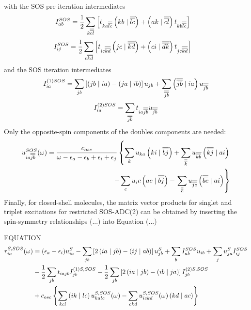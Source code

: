 \noindent with the SOS pre-iteration intermediates 
\begin{equation}
\begin{split}
I_{ab}^{SOS} &= \frac{1}{2} \sum_{k\overline{\overline{cl}}} \left[ t_{ka\overline{\overline{lc}}} \left( kb \mid \overline{\overline{lc}} \right) + \left( ak \mid \overline{\overline{cl}} \right) t_{kb\overline{\overline{lc}}} \right]
\end{split}
\end{equation}
\begin{equation}
\begin{split}
I_{ij}^{SOS} &= \frac{1}{2} \sum_{c\overline{\overline{kd}}} \left[ t_{ic\overline{\overline{kd}}} \left( jc \mid \overline{\overline{kd}} \right) + \left( ci \mid \overline{\overline{dk}} \right) t_{jc\overline{\overline{kd}}} \right]  
\end{split}
\end{equation}
\noindent and the SOS iteration intermediates
\begin{equation}
I_{ia}^{(1)SOS} = \sum_{jb} \left[ \left( jb \mid ia \right) - \left( ja \mid ib \right) \right] u_{jb} + \sum_{\overline{\overline{jb}}} \left( \overline{\overline{jb}} \mid ia \right) u_{\overline{\overline{jb}}}
\end{equation}
\begin{equation}
I_{ia}^{(2)SOS} = \sum_{\overline{\overline{jb}}} t_{ia\overline{\overline{jb}}} u_{\overline{\overline{jb}}}
\end{equation}
\noindent Only the opposite-spin components of the doubles components are needed:
\begin{equation}
\begin{split}
u_{ia\overline{\overline{jb}}}^{SOS}(\omega) = \frac{c_{osc}}{\omega - \epsilon_a - \epsilon_b + \epsilon_i + \epsilon_j} \left\lbrace \sum_k u_{ka} \left( ki \mid \overline{\overline{bj}} \right) + \sum_{\overline{\overline{k}}} u_{\overline{\overline{kb}}} \left( \overline{\overline{kj}} \mid ai \right) \right. \\ - \sum_c u_ic \left( ac \mid \overline{\overline{bj}} \right) - \left. \sum_{\overline{\overline{c}}} u_{\overline{\overline{jc}}} \left( \overline{\overline{bc}} \mid ai \right) \right\rbrace
\end{split}
\end{equation}
\noindent Finally, for closed-shell molecules, the matrix vector products for singlet and triplet excitations for restricted SOS-ADC(2) can be obtained by inserting the spin-symmetry relationships (...) into Equation (...)
\begin{myframe}{EQUATION}
\begin{equation}
\begin{split}
r_{ia}^{S,SOS}(\omega) &= (\epsilon_a - \epsilon_i) u_{ia}^S - \sum_{jb} \left[ 2\left( ia \mid jb \right) - \left( ij \mid ab \right) \right] u_{jb}^S + \sum_b I^{SOS}_{ab} u_{ib} + \sum_j u_{ja}^S I^{SOS}_{ij} \\
&- \frac{1}{2} \sum_{jb} t_{iajb}I^{(1)S,SOS}_{jb} - \frac{1}{2} \sum_{jb} \left[ 2\left( ia \mid jb \right) - \left( ib \mid ja \right) \right] I^{(2)S,SOS}_{jb} \\
&+ c_{osc} \left\lbrace \sum_{kcl} \left( ik \mid lc \right) u^{S,SOS}_{kalc}(\omega) - \sum_{ckd} u^{S,SOS}_{ickd}(\omega) \left( kd \mid ac \right) \right\rbrace
\end{split}
\end{equation} 
\end{myframe}
